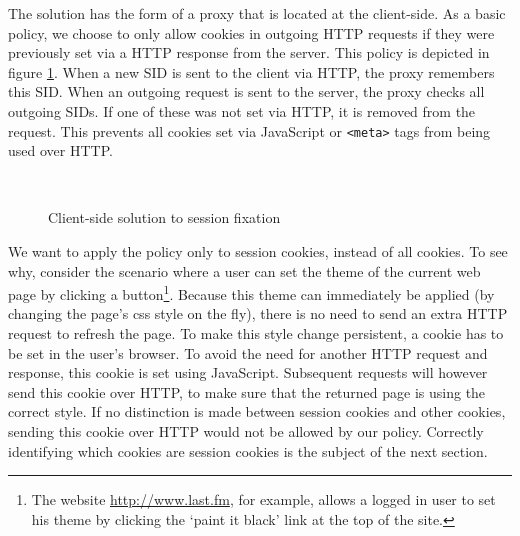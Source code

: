 The solution has the form of a proxy that is located at the client-side. As a basic policy, we choose to only allow cookies in outgoing HTTP requests if they were previously set via a HTTP response from the server. This policy is depicted in figure \ref{fig:clientside-proxy}. When a new SID is sent to the client via HTTP, the proxy remembers this SID. When an outgoing request is sent to the server, the proxy checks all outgoing SIDs. If one of these was not set via HTTP, it is removed from the request. This prevents all cookies set via JavaScript or \texttt{<meta>} tags from being used over HTTP.

\begin{figure}[ht]
	\centering
	\\
	\caption{Client-side solution to session fixation}
	\label{fig:clientside-proxy}
\end{figure}

We want to apply the policy only to \glspl{session cookie}, instead of all cookies. To see why, consider the scenario where a user can set the theme of the current web page by clicking a button\footnote{The website \url{http://www.last.fm}, for example, allows a logged in user to set his theme by clicking the `paint it black' link at the top of the site.}. Because this theme can immediately be applied (by changing the page's css style on the fly), there is no need to send an extra HTTP request to refresh the page. To make this style change persistent, a cookie has to be set in the user's browser. To avoid the need for another HTTP request and response, this cookie is set using JavaScript. Subsequent requests will however send this cookie over HTTP, to make sure that the returned page is using the correct style. If no distinction is made between session cookies and other cookies, sending this cookie over HTTP would not be allowed by our policy. Correctly identifying which cookies are session cookies is the subject of the next section.

